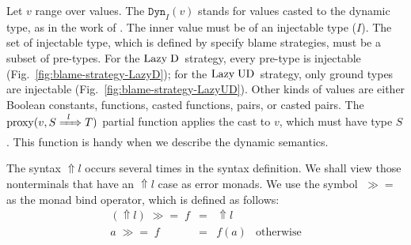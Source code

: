 \documentclass[runningheads]{llncs}
\newcommand{\LUD}{\ensuremath{\text{Lazy\;UD}}}
\newcommand{\LD}{\ensuremath{\text{Lazy\;D}}}
\newcommand{\error}[1]{\ensuremath{\Uparrow#1}}
\newcommand{\Pbool}[0]{\ensuremath{\mathtt{Bool}}}
\newcommand{\etrue}[0]{\mathtt{true}}
\newcommand{\ecast}[2]{\ensuremath{#1 : #2}}
\newcommand{\ccast}[3]{#1 \xRightarrow[]{\enskip #2 \enskip} #3}
\newcommand{\vdyn}[2]{\mathtt{Dyn}_{#1}(#2)}
\newcommand{\mbind}[0]{\ensuremath{\;\gg=\;}}
\newcommand{\proxy}[2]{\ensuremath{\mathrm{proxy}(#1,#2)}}
\begin{document}
Let $v$ range over values. The $\vdyn{I}{v}$ stands for values casted
to the dynamic type, as in the work of \citet{wadler2009well}. The
inner value must be of an injectable type ($I$).
The set of injectable type, which is defined by specify blame strategies,
must be a subset of pre-types.
%
For the \LD\ strategy, every pre-type is injectable 
(Fig.~\ref{fig:blame-strategy-LazyD});
%
for the \LUD\ strategy, only ground types are injectable 
(Fig.~\ref{fig:blame-strategy-LazyUD}).
%
Other kinds of values are either Boolean constants, functions, casted 
functions, pairs, or casted pairs.
%
The \proxy{v}{\ccast{S}{l}{T}} partial function applies the cast to $v$, which must
have type $S$. This function is handy when we describe the dynamic semantics.

The syntax \error{l} occurs several times in the syntax definition. We shall 
view those nonterminals that have an \error{l} case as error monads. We use 
the symbol \mbind{} as the monad bind operator, which is defined as follows:
\[
\begin{array}{rcll}
(\error{l}) \mbind f & = & \error{l} \\
          a \mbind f & = & f(a)      & \text{otherwise}
\end{array}
\]
\end{document}
